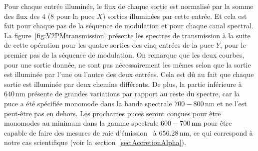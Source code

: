 Pour chaque entrée illuminée, le flux de chaque sortie est normalisé par la somme des flux des $4$ ($8$ pour la puce $X$) sorties illuminées par cette entrée. Et cela est fait pour chaque pas de la séquence de modulation et pour chaque canal spectral. La figure~\ref{fig:V2PMtransmission} présente les spectres de transmission à la suite de cette opération pour les quatre sorties des cinq entrées de la puce $Y$, pour le premier pas de la séquence de modulation. On remarque que les deux courbes, pour une sortie donnée, ne sont pas nécessairement les mêmes selon que la sortie est illuminée par l'une ou l'autre des deux entrées. Cela est dû au fait que chaque sortie est illuminée par deux chemins différents. De plus, la partie inférieure à $640 \,$nm présente de grandes variations par rapport au reste du spectre, car la puce a été spécifiée monomode dans la bande spectrale $700 - 800 \,$nm et ne l'est peut-être pas en dehors. Les prochaines puces seront conçues pour être monomodes au minimum dans la gamme spectrale $600 - 700 \,$nm pour être capable de faire des mesures de raie d'émission \ha~à $656.28 \,$nm, ce qui correspond à notre cas scientifique (voir la section~\ref{sec:AccretionAlpha}).

